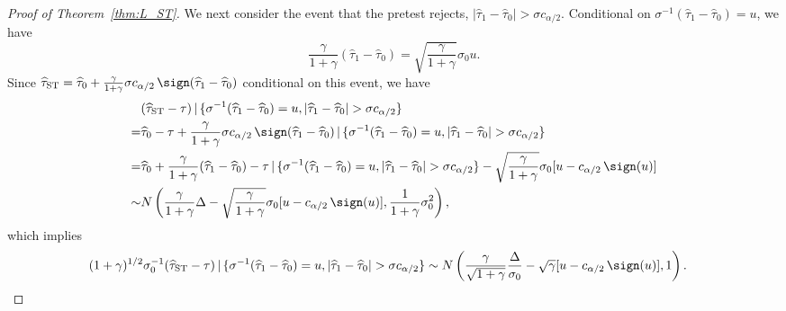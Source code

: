 \documentclass[11pt]{article}
\def\given{\,|\,}
\newcommand{\htau}{\widehat\tau}
\numberwithin{equation}{section}
\theoremstyle{definition}
\begin{document}
\begin{proof}[Proof of Theorem~\ref{thm:L_ST}]
We next consider the event that the pretest rejects, $\lvert \htau_1 - \htau_0 \rvert > \sigma c_{\alpha/2}$. Conditional on $\sigma^{-1}(\htau_1 - \htau_0) = u$, we have
\[
  \frac{\gamma}{1+\gamma} (\htau_1-\htau_0) = \sqrt{\frac{\gamma}{1+\gamma}} \sigma_0 u.
\]
Since $\htau_{\rm ST} = \htau_0 + \frac{\gamma}{1+\gamma} \sigma c_{\alpha/2}\,\sign(\htau_1 - \htau_0)$ conditional on this event, we have
\begin{align*}
  &(\htau_{\rm ST} - \tau) \given \{\sigma^{-1}(\htau_1 - \htau_0) = u, \lvert \htau_1 - \htau_0 \rvert > \sigma c_{\alpha/2}\} \\
  =& \htau_0 - \tau + \frac{\gamma}{1+\gamma} \sigma c_{\alpha/2}\,\sign(\htau_1 - \htau_0)\given \{\sigma^{-1}(\htau_1 - \htau_0) = u, \lvert \htau_1 - \htau_0 \rvert > \sigma c_{\alpha/2}\}\\
  =& \htau_0 + \frac{\gamma}{1+\gamma} (\htau_1-\htau_0)-\tau \given \{\sigma^{-1}(\htau_1 - \htau_0) = u, \lvert \htau_1 - \htau_0 \rvert > \sigma c_{\alpha/2}\} - \sqrt{\frac{\gamma}{1+\gamma}} \sigma_0 [u - c_{\alpha/2}\,\sign(u)]\\
  \sim& N\left(\frac{\gamma}{1+\gamma}\Delta - \sqrt{\frac{\gamma}{1+\gamma}} \sigma_0 [u - c_{\alpha/2}\,\sign(u)], \frac{1}{1+\gamma} \sigma_0^2\right),
\end{align*}
which implies
\begin{align*}
  &(1+\gamma)^{1/2} \sigma_0^{-1} (\htau_{\rm ST} - \tau) \given \{\sigma^{-1}(\htau_1 - \htau_0) = u, \lvert \htau_1 - \htau_0 \rvert > \sigma c_{\alpha/2}\} \sim N\left(\frac{\gamma}{\sqrt{1+\gamma}} \frac{\Delta}{\sigma_0} - \sqrt{\gamma} [u - c_{\alpha/2}\,\sign(u)], 1\right).
\end{align*}
  

\end{proof}
\end{document}
